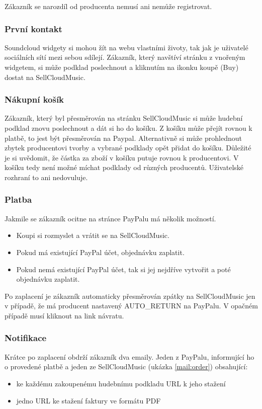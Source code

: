 \documentclass[12pt]{article}
\begin{document}
Zákazník se narozdíl od producenta nemusí ani nemůže registrovat.

\subsubsection{První kontakt}
Soundcloud widgety si mohou žít na webu vlastními životy, tak jak je uživatelé sociálních sítí mezi sebou sdílejí. Zákazník, který navštíví stránku z vnořeným widgetem, si může podklad poslechnout a kliknutím na ikonku koupě (Buy) dostat na SellCloudMusic.

\subsubsection{Nákupní košík}
Zákazník, který byl přesměrován na stránku SellCloudMusic si může hudební podklad znovu poslechnout a dát si ho do košíku. Z košíku může přejít rovnou k platbě, to jest být přesměrován na Paypal. Alternativně si může prohlednout zbytek producentovi tvorby a vybrané podklady opět přidat do košíku.
Důležité je si uvědomit, že částka za zboží v košíku putuje rovnou k producentovi. V košíku tedy není možné míchat podklady od různých producentů. Uživatelské rozhraní to ani nedovuluje.

\subsubsection{Platba}
Jakmile se zákazník ocitne na stránce PayPalu má několik možností.
\begin{itemize}
\item Koupi si rozmyslet a vrátit se na SellCloudMusic.
\item Pokud má existující PayPal účet, objednávku zaplatit.
\item Pokud nemá existující PayPal účet, tak si jej nejdříve vytvořit a poté objednávku zaplatit.
\end{itemize}

Po zaplacení je zákazník automaticky přesměrován zpátky na SellCloudMusic jen v případě, že má producent nastavený AUTO\_RETURN na PayPalu. V opačném případě musí kliknout na link návratu.

\subsubsection{Notifikace}
Krátce po zaplacení obdrží zákazník dva emaily. Jeden z PayPalu, informující ho o provedené platbě a jeden ze SellCloudMusic (ukázka \ref{mail:order}) obsahující:
\begin{itemize}
\item ke každému zakoupenému hudebnímu podkladu URL k jeho stažení
\item jedno URL ke stažení faktury ve formátu PDF
\end{itemize}
\end{document}
